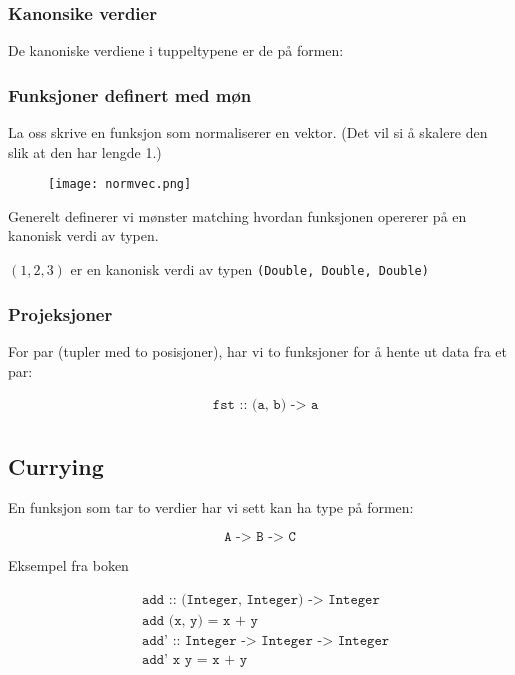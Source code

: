 \documentclass{article}
\begin{document}
\subsubsection{Kanonsike verdier}

De kanoniske verdiene i tuppeltypene er de på formen:

\subsubsection{Funksjoner definert med møn}

\begin{eg}
    La oss skrive en funksjon som normaliserer en vektor. (Det vil si å skalere den slik at den har lengde 1.)

    \begin{figure}[H]
        \begin{center}
            \texttt{[image: normvec.png]}
        \end{center}
    \end{figure}
\end{eg}

Generelt definerer vi mønster matching hvordan funksjonen opererer på en kanonisk verdi av typen.
\medskip

\( \left( 1,2,3 \right) \) er en kanonisk verdi av typen \texttt{(Double, Double, Double)}

\subsubsection{Projeksjoner}
For par (tupler med to posisjoner), har vi to funksjoner for å hente ut data fra et par:

\begin{align*}
    &\texttt{fst :: (a, b) -> a} \\
\end{align*}

\subsection{Currying}
En funksjon som tar to verdier har vi sett kan ha type på formen:

\[ \texttt{A -> B -> C} \]

Eksempel fra boken

\begin{align*}
    &\texttt{add :: (Integer, Integer) -> Integer} \\ 
    &\texttt{add (x, y) = x + y}\\
    &\texttt{add' :: Integer -> Integer -> Integer}\\
    &\texttt{add' x y = x + y}
\end{align*}
\end{document}
